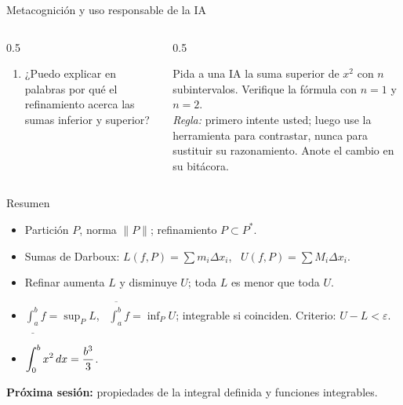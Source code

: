 \documentclass[10pt,aspectratio=169]{beamer}
\begin{document}
\begin{frame}{Metacognición y uso responsable de la IA}
  \small
  \begin{columns}[t]
    \begin{column}{0.5\textwidth}
      \begin{metacog}
        \begin{enumerate}
          \metacomun
          \item ¿Puedo explicar en palabras por qué el refinamiento acerca las sumas inferior y superior?
        \end{enumerate}
      \end{metacog}
    \end{column}
    \begin{column}{0.5\textwidth}
      \begin{iabox}
        Pida a una IA la suma superior de $x^2$ con $n$ subintervalos. Verifique la fórmula con $n=1$ y $n=2$.\\[2pt]
        \textit{Regla:} primero intente usted; luego use la herramienta para contrastar, nunca para sustituir su razonamiento. Anote el cambio en su bitácora.
      \end{iabox}
    \end{column}
  \end{columns}
\end{frame}

\begin{frame}{Resumen}
  \begin{itemize}
    \item Partición $P$, norma $\|P\|$; refinamiento $P\subset P^*$.
    \item Sumas de Darboux: $L(f,P)=\sum m_i\Delta x_i$, \ $U(f,P)=\sum M_i\Delta x_i$.
    \item Refinar aumenta $L$ y disminuye $U$; toda $L$ es menor que toda $U$.
    \item $\displaystyle\underline{\int_a^b}f=\sup_PL$, \ $\displaystyle\overline{\int_a^b}f=\inf_PU$;
      integrable si coinciden. Criterio: $U-L<\varepsilon$.
    \item $\displaystyle\int_0^bx^2\,dx=\frac{b^3}{3}$.
  \end{itemize}
  \vspace{3mm}
  \textbf{Próxima sesión:} propiedades de la integral definida y funciones integrables.
\end{frame}
\end{document}
